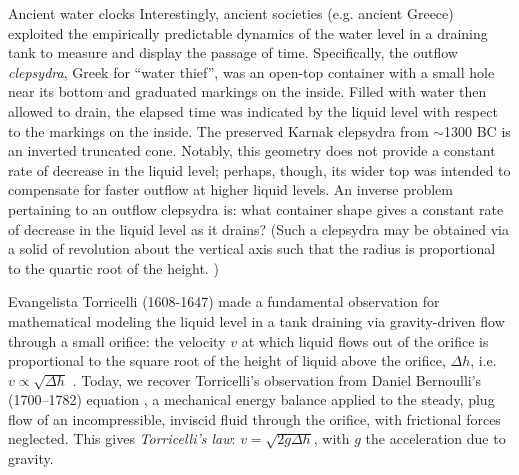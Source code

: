 \documentclass[openacc]{rsproca_new}%
\begin{document}
\begin{mytcbox}[label=box:waterclocks, breakable]{Ancient water clocks}
Interestingly, ancient societies (e.g. ancient Greece) exploited the empirically predictable dynamics of the water level in a draining tank to measure and display the passage of time.
Specifically, the outflow \emph{clepsydra}, Greek for ``water thief'', was an open-top container with a small hole near its bottom and graduated markings on the inside. 
Filled with water then allowed to drain, the elapsed time was indicated by the liquid level with respect to the markings on the inside. \cite{bedini1962compartmented,hwang2021historical,ritner2016oriental,hejun1987research,schomberg2018karnak,mills1982newton}
The preserved Karnak clepsydra from $\sim$1300 BC \cite{schomberg2018karnak} is an inverted truncated cone. Notably, this geometry does not provide a constant rate of decrease in the liquid level; perhaps, though, its wider top was intended to compensate for faster outflow at higher liquid levels. An inverse problem pertaining to an outflow clepsydra is: what container shape gives a constant rate of decrease in the liquid level as it drains?
(Such a clepsydra may be obtained via a solid of revolution about the vertical axis such that the radius is proportional to the quartic root of the height. \cite{mills1982newton,d2021torricelli})
\end{mytcbox}


Evangelista Torricelli (1608-1647) made a fundamental observation for mathematical modeling the liquid level in a tank draining via gravity-driven flow through a small orifice: the velocity $v$ at which liquid flows out of the orifice is proportional to the square root of the height of liquid above the orifice, $\Delta h$, i.e. $v\propto \sqrt{\Delta h}$ \cite{mills1982newton}.
Today, we recover Torricelli's observation from Daniel Bernoulli's (1700–1782) equation \cite{welty2020fundamentals}, a mechanical energy balance applied to the steady, plug flow of an incompressible, inviscid fluid through the orifice, with frictional forces neglected. This gives \emph{Torricelli's law}: $v=\sqrt{2 g \Delta h}$, with $g$ the acceleration due to gravity. \cite{d2021torricelli,teoman2022discharge}
\end{document}
